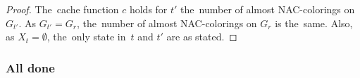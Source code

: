 \subsubsection*{\RootNode{}}

%
%
\begin{proof}
	The~cache function \( c \) holds for \( t' \) the~number of almost NAC-colorings on \( G_{t'} \).
	As \( G_{t'} = G_r \), the~number of almost NAC-colorings on \( G_r \) is the~same.
	Also, as \( X_t = \emptyset \), the~only state in~\( t \) and \( t' \) are as stated.
\end{proof}
%

\subsubsection*{All done}

